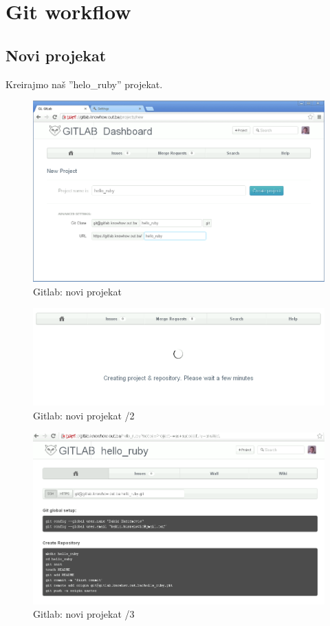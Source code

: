 \documentclass[times, utf8, seminar]{fit}
\begin{document}
\section{Git workflow}

\subsection{Novi projekat}

Kreirajmo naš ''helo\_ruby'' projekat.

\begin{figure}[H]
\centering
\includegraphics[width=15cm]{img/gitlab_new_project.png}
\caption{Gitlab: novi projekat}
\end{figure}


\begin{figure}[H]
\centering
\includegraphics[width=15cm]{img/gitlab_new_project_2.png}
\caption{Gitlab: novi projekat /2}
\end{figure}


\begin{figure}[H]
\centering
\includegraphics[width=15cm]{img/gitlab_new_project_3.png}
\caption{Gitlab: novi projekat /3}
\end{figure}
\end{document}
